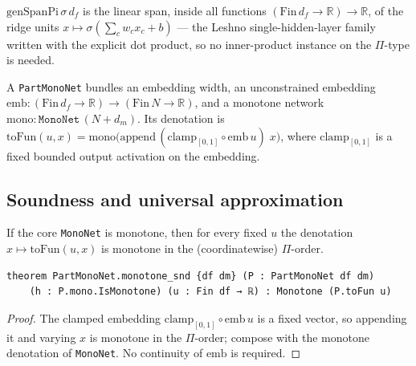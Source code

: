 \begin{definition}\label{def:genspanpi}
  \leanok
  $\mathrm{genSpanPi}\,\sigma\,d_f$ is the linear span, inside all functions
  $(\mathrm{Fin}\,d_f\to\mathbb{R})\to\mathbb{R}$, of the ridge units
  $x\mapsto\sigma\!\left(\sum_c w_c x_c + b\right)$ --- the Leshno single-hidden-layer family
  written with the explicit dot product, so no inner-product instance on the $\Pi$-type is needed.
\end{definition}

\begin{definition}\label{def:partmononet}
  \leanok
  A \texttt{PartMonoNet} bundles an embedding width, an unconstrained embedding
  $\mathrm{emb}\colon(\mathrm{Fin}\,d_f\to\mathbb{R})\to(\mathrm{Fin}\,N\to\mathbb{R})$, and a
  monotone network $\mathrm{mono}\colon\texttt{MonoNet}\,(N+d_m)$. Its denotation is
  $\mathrm{toFun}(u,x)=\mathrm{mono}\big(\mathrm{append}\,(\mathrm{clamp}_{[0,1]}\circ
  \mathrm{emb}\,u)\;x\big)$, where $\mathrm{clamp}_{[0,1]}$ is a fixed bounded output activation on
  the embedding.
\end{definition}

\subsection{Soundness and universal approximation}

\begin{theorem}\label{thm:runje-sound}
  \leanok
  If the core \texttt{MonoNet} is monotone, then for every fixed $u$ the denotation
  $x\mapsto\mathrm{toFun}(u,x)$ is monotone in the (coordinatewise) $\Pi$-order.
\end{theorem}
\begin{verbatim}
theorem PartMonoNet.monotone_snd {df dm} (P : PartMonoNet df dm)
    (h : P.mono.IsMonotone) (u : Fin df → ℝ) : Monotone (P.toFun u)
\end{verbatim}
\begin{proof}\leanok
  The clamped embedding $\mathrm{clamp}_{[0,1]}\circ\mathrm{emb}\,u$ is a fixed vector, so
  appending it and varying $x$ is monotone in the $\Pi$-order; compose with the monotone
  denotation of \texttt{MonoNet}. No continuity of $\mathrm{emb}$ is required.
\end{proof}

